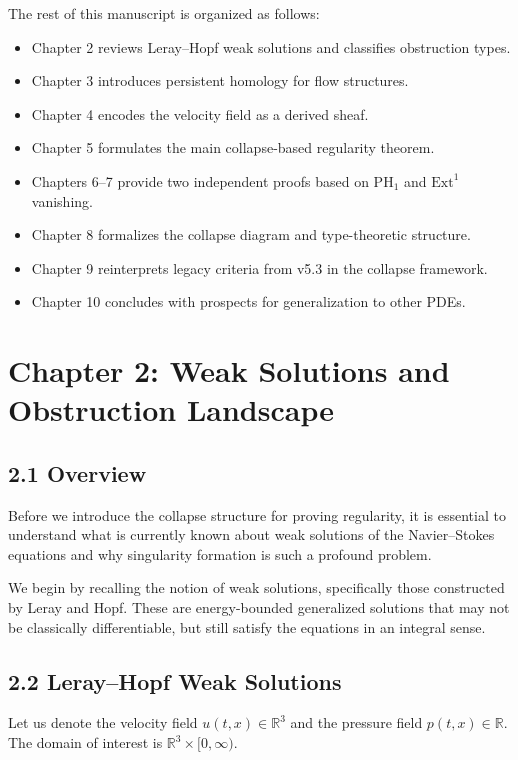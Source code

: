 \documentclass[11pt]{article}
\begin{document}
The rest of this manuscript is organized as follows:

\begin{itemize}
  \item Chapter 2 reviews Leray–Hopf weak solutions and classifies obstruction types.
  \item Chapter 3 introduces persistent homology for flow structures.
  \item Chapter 4 encodes the velocity field as a derived sheaf.
  \item Chapter 5 formulates the main collapse-based regularity theorem.
  \item Chapters 6–7 provide two independent proofs based on \( \mathrm{PH}_1 \) and \( \mathrm{Ext}^1 \) vanishing.
  \item Chapter 8 formalizes the collapse diagram and type-theoretic structure.
  \item Chapter 9 reinterprets legacy criteria from v5.3 in the collapse framework.
  \item Chapter 10 concludes with prospects for generalization to other PDEs.
\end{itemize}



\section{Chapter 2: Weak Solutions and Obstruction Landscape}

\subsection{2.1 Overview}

Before we introduce the collapse structure for proving regularity, it is essential to understand what is currently known about weak solutions of the Navier–Stokes equations and why singularity formation is such a profound problem.

We begin by recalling the notion of weak solutions, specifically those constructed by Leray and Hopf. These are energy-bounded generalized solutions that may not be classically differentiable, but still satisfy the equations in an integral sense.

\subsection{2.2 Leray--Hopf Weak Solutions}

Let us denote the velocity field \( u(t,x) \in \mathbb{R}^3 \) and the pressure field \( p(t,x) \in \mathbb{R} \). The domain of interest is \( \mathbb{R}^3 \times [0,\infty) \).
\end{document}
